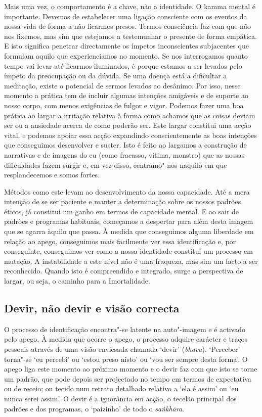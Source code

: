 Mais uma vez, o comportamento é a chave, não a identidade. O kamma mental é
importante. Devemos de estabelecer uma ligação consciente com os eventos da
nossa vida de forma a não ficarmos presos. Termos consciência faz com que não
nos fixemos, mas sim que estejamos a testemunhar o presente de forma empática. E
isto significa penetrar directamente os ímpetos inconscientes subjacentes que
formulam aquilo que experienciamos no momento. Se nos interrogamos quanto tempo
vai levar até ficarmos iluminados, é porque estamos a ser levados pelo ímpeto da
preocupação ou da dúvida. Se uma doença está a dificultar a meditação, existe o
potencial de sermos levados ao desânimo. Por isso, nesse momento a prática tem
de incluir algumas intenções amigáveis e de suporte ao nosso corpo, com menos
exigências de fulgor e vigor. Podemos fazer uma boa prática ao largar a
irritação relativa à forma como achamos que as coisas deviam ser ou a ansiedade
acerca de como poderão ser. Este largar constitui uma acção vital, e podemos
apoiar essa acção expandindo conscientemente as boas intenções que conseguimos
desenvolver e suster. Isto é feito ao largamos a construção de narrativas e de
imagens do eu (como fracasso, vítima, monstro) que as nossas dificuldades fazem
surgir e, em vez disso, centramo"-nos naquilo em que resplandecemos e somos
fortes.

Métodos como este levam ao desenvolvimento da nossa capacidade. Até a mera
intenção de se ser paciente e manter a determinação sobre os nossos padrões
éticos, já constitui um ganho em termos de capacidade mental. E ao sair de
padrões e programas habituais, começamos a despertar para além desta imagem que
se agarra àquilo que passa. À medida que conseguimos alguma liberdade em relação
ao apego, conseguimos mais facilmente ver essa identificação e, por conseguinte,
conseguimos ver como a nossa identidade constitui um processo em mutação. A
instabilidade a este nível não é uma fraqueza, mas sim um facto a ser
reconhecido. Quando isto é compreendido e integrado, surge a perspectiva de
largar, ou seja, o caminho para a Imortalidade.

\subsection{Devir, não devir e visão correcta}

O processo de identificação encontra"-se latente na auto"-imagem e é activado
pelo apego. À medida que ocorre o apego, o processo adquire carácter e traços
pessoais através de uma visão enviesada chamada `devir' (\emph{bhava}).
`Perceber' torna"-se `eu percebi' ou `estou preso nisto' ou `vou ser sempre
desta forma'. O apego liga este momento ao próximo momento e o devir faz com que
isto se torne um padrão, que pode depois ser projectado no tempo em termos de
expectativa ou de receio; ou tecido num retrato detalhado relativo a `ela é
assim' ou `eu nunca serei assim'. O devir é a ignorância em acção, o tecelão
principal dos padrões e dos programas, o `paizinho' de todo o \emph{saṅkhāra}.


